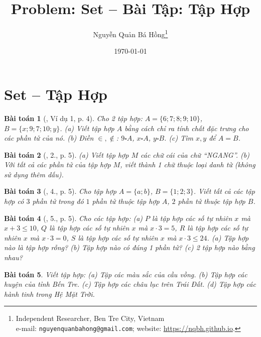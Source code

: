 \documentclass{article}
\title{Problem: Set -- Bài Tập: Tập Hợp}
\author{Nguyễn Quản Bá Hồng\footnote{Independent Researcher, Ben Tre City, Vietnam\\e-mail: \texttt{nguyenquanbahong@gmail.com}; website: \url{https://nqbh.github.io}.}}
\date{\today}
\newtheorem{baitoan}{Bài toán}
\begin{document}
\maketitle
\tableofcontents


\section{Set -- Tập Hợp}

\begin{baitoan}[\cite{Tuyen_Toan_6}, Ví dụ 1, p. 4]
	Cho 2 tập hợp: $A = \{6;7;8;9;10\}$, $B = \{x;9;7;10;y\}$. (a) Viết tập hợp $A$ bằng cách chỉ ra tính chất đặc trưng cho các phần tử của nó. (b) Điền $\in,\notin$: $9\square A$, $x\square A$, $y\square B$. (c) Tìm $x,y$ để $A = B$.
\end{baitoan}

\begin{baitoan}[\cite{Tuyen_Toan_6}, 2., p. 5]
	(a) Viết tập hợp $M$ các chữ cái của chữ ``NGANG''. (b) Với tất cả các phần tử của tập hợp $M$, viết thành 1 chữ thuộc loại danh từ (không sử dụng thêm dấu).
\end{baitoan}

\begin{baitoan}[\cite{Tuyen_Toan_6}, 4., p. 5]
	Cho tập hợp $A = \{a;b\}$, $B = \{1;2;3\}$. Viết tất cả các tập hợp có $3$ phần tử trong đó $1$ phần tử thuộc tập hợp $A$, $2$ phần tử thuộc tập hợp $B$.
\end{baitoan}

\begin{baitoan}[\cite{Tuyen_Toan_6}, 5., p. 5]
	Cho các tập hợp: (a) $P$ là tập hợp các số tự nhiên $x$ mà $x + 3\le10$, $Q$ là tập hợp các số tự nhiên $x$ mà $x\cdot3 = 5$, $R$ là tập hợp các số tự nhiên $x$ mà $x\cdot3 = 0$, $S$ là tập hợp các số tự nhiên $x$ mà $x\cdot3\le24$. (a) Tập hợp nào là tập hợp rỗng? (b) Tập hợp nào có đúng 1 phần tử? (c) 2 tập hợp nào bằng nhau?
\end{baitoan}

\begin{baitoan}
	Viết tập hợp: (a) Tập các màu sắc của cầu vồng. (b) Tập hợp các huyện của tỉnh Bến Tre. (c) Tập hợp các châu lục trên Trái Đất. (d) Tập hợp các hành tinh trong Hệ Mặt Trời.
\end{baitoan}
\end{document}
